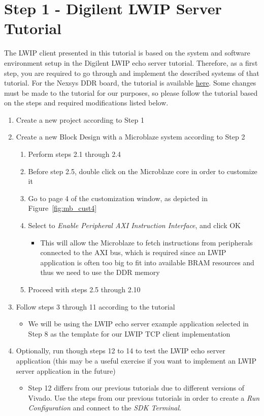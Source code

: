 \documentclass[11pt]{article}
\begin{document}
\section*{Step 1 - Digilent LWIP Server Tutorial}
The LWIP client presented in this tutorial is based on the system and software environment setup in the Digilent LWIP echo server tutorial. Therefore, as a first step, you are required to go through and implement the described systems of that tutorial. For the Nexsys DDR board, the tutorial is available \href{https://reference.digilentinc.com/learn/programmable-logic/tutorials/nexys-4-ddr-getting-started-with-microblaze-servers/start}{\color{blue}here}. Some changes must be made to the tutorial for our purposes, so please follow the tutorial based on the steps and required modifications listed below.

\begin{enumerate}
    \item Create a new project according to Step 1
    \item Create a new Block Design with a Microblaze system according to Step 2
    \begin{enumerate}
        \item Perform steps 2.1 through 2.4
        \item Before step 2.5, double click on the Microblaze core in order to customize it
        \item Go to page 4 of the customization window, as depicted in Figure~\ref{fig:mb_cust4}
        \item Select to \textit{Enable Peripheral AXI Instruction Interface}, and click OK
        \begin{itemize}
            \item This will allow the Microblaze to fetch instructions from peripherals connected to the AXI bus, which is required since an LWIP application is often too big to fit into available BRAM resources and thus we need to use the DDR memory
        \end{itemize}
        \item Proceed with steps 2.5 through 2.10
    \end{enumerate}
    \item Follow steps 3 through 11 according to the tutorial
    \begin{itemize}
        \item We will be using the LWIP echo server example application selected in Step 8 as the template for our LWIP TCP client implementation
    \end{itemize}
    \item Optionally, run though steps 12 to 14 to test the LWIP echo server application (this may be a useful exercise if you want to implement an LWIP server application in the future)
    \begin{itemize}
        \item Step 12 differs from our previous tutorials due to different versions of Vivado. Use the steps from our previous tutorials in order to create a \textit{Run Configuration} and connect to the \textit{SDK Terminal}.
    \end{itemize}
\end{enumerate}
\end{document}
